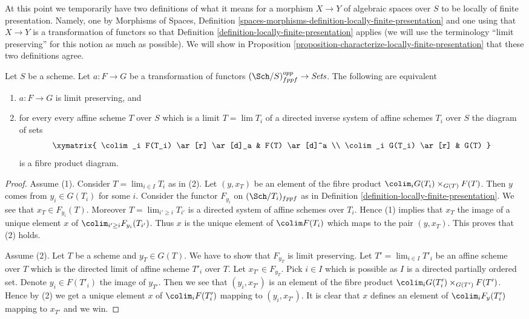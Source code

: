 \medskip\noindent
At this point we temporarily have two definitions of what it means
for a morphism $X \to Y$ of algebraic spaces over $S$ to be locally of finite
presentation. Namely, one by
Morphisms of Spaces,
Definition \ref{spaces-morphisms-definition-locally-finite-presentation}
and one using that $X \to Y$ is a transformation of functors so that
Definition \ref{definition-locally-finite-presentation}
applies (we will use the terminology ``limit preserving''
for this notion as much as possible). We will show in
Proposition \ref{proposition-characterize-locally-finite-presentation}
that these two definitions agree.

\begin{lemma}
\label{lemma-characterize-relative-limit-preserving}
Let $S$ be a scheme. Let $a : F \to G$ be a transformation of functors
$(\Sch/S)_{fppf}^{opp} \to \textit{Sets}$.
The following are equivalent
\begin{enumerate}
\item $a : F \to G$ is limit preserving, and
\item for every every affine scheme $T$ over $S$ which is a
limit $T = \lim T_i$ of a directed inverse system of affine
schemes $T_i$ over $S$ the diagram of sets
$$
\xymatrix{
\colim_i F(T_i) \ar[r] \ar[d]_a & F(T) \ar[d]^a \\
\colim_i G(T_i) \ar[r] & G(T)
}
$$
is a fibre product diagram.
\end{enumerate}
\end{lemma}

\begin{proof}
Assume (1). Consider $T = \lim_{i \in I} T_i$ as in (2). Let
$(y, x_T)$ be an element of the fibre product
$\colim_i G(T_i) \times_{G(T)} F(T)$.
Then $y$ comes from $y_i \in G(T_i)$ for some $i$.
Consider the functor $F_{y_i}$ on $(\Sch/T_i)_{fppf}$ as in
Definition \ref{definition-locally-finite-presentation}.
We see that $x_T \in F_{y_i}(T)$. Moreover $T = \lim_{i' \geq i} T_{i'}$
is a directed system of affine schemes over $T_i$. Hence (1) implies
that $x_T$ the image of a unique element $x$ of
$\colim_{i' \geq i} F_{y_i}(T_{i'})$. Thus $x$ is the unique
element of $\colim F(T_i)$ which maps to the pair $(y, x_T)$.
This proves that (2) holds.

\medskip\noindent
Assume (2). Let $T$ be a scheme and $y_T \in G(T)$. We have to show that
$F_{y_T}$ is limit preserving. Let $T' = \lim_{i \in I} T'_i$ be an
affine scheme over $T$ which is the directed limit of affine scheme $T'_i$
over $T$. Let $x_{T'} \in F_{y_T}$. Pick $i \in I$ which is possible as
$I$ is a directed partially ordered set. Denote $y_i \in F(T'_i)$ the
image of $y_{T'}$. Then we see that $(y_i, x_{T'})$ is an
element of the fibre product
$\colim_i G(T'_i) \times_{G(T')} F(T')$.
Hence by (2) we get a unique element $x$ of $\colim_i F(T'_i)$
mapping to $(y_i, x_{T'})$. It is clear that $x$ defines an element
of $\colim_i F_y(T'_i)$ mapping to $x_{T'}$ and we win.
\end{proof}

